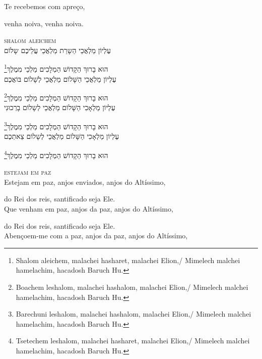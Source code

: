Te recebemos com apreço,

venha noiva, venha noiva.


\movetoevenpage
\raggedleft
{}

\vspace*{1cm}

\textsc{shalom aleichem}\\[15pt]

עֶלְיוֹן מַלְאֲכֵי הַשָרֵת מַלְאֲכֵי עֲלֵיכֶם שָלוֹם

\footnote{Shalom aleichem, malachei hasharet, malachei Elion,/ Mimelech malchei hamelachim, hacadosh Baruch Hu.}הוּא בָרוּךְ הַקָדוֹשׁ הַמְלָכִים מַלְכֵי מִמֶלֶךְ\\[10pt]

עֶלְיוֹן מַלְאֲכֵי הַשָּׁלוֹם מַלְאֲכֵי לְשָׁלוֹם בּוֹאֲכֶם

\footnote{Boachem leshalom, malachei hashalom, malachei Elion,/ Mimelech malchei hamelachim, hacadosh Baruch Hu.}הוּא בָרוּךְ הַקָדוֹשׁ הַמְלָכִים מַלְכֵי מִמֶלֶךְ\\[10pt]

עֶלְיוֹן מַלְאָכִי הַשָּׁלוֹם מַלְאֲכֵי לְשָלוֹם בָרְכוּנִי

\footnote{Barechuni leshalom, malachei hashalom, malachei Elion,/ Mimelech malchei hamelachim, hacadosh Baruch Hu.}הוּא בָרוּךְ הַקָדוֹשׁ הַמְלָכִים מַלְכֵי מִמֶלֶךְ\\[10pt] 

עֶלְיוֹן מַלְאָכִי הַשָּׁלוֹם מַלְאֲכֵי לְשָלוֹם צֵאתְכֶם 

\footnote{Tsetechem leshalom, malachei hasharet, malachei Elion,/ Mimelech malchei hamelachim, hacadosh Baruch Hu.}הוּא בָרוּךְ הַקָדוֹשׁ הַמְלָכִים מַלְכֵי מִמֶלֶךְ


\movetooddpage
\raggedright

\vspace*{1cm}

\textsc{estejam em paz}\\[15pt]


Estejam em paz, anjos enviados, anjos do Altíssimo,

do Rei dos reis, santificado seja Ele.\\[10pt]

Que venham em paz, anjos da paz, anjos do Altíssimo,

do Rei dos reis, santificado seja Ele.\\[10pt]

Abençoem-me com a paz, anjos da paz, anjos do Altíssimo,

